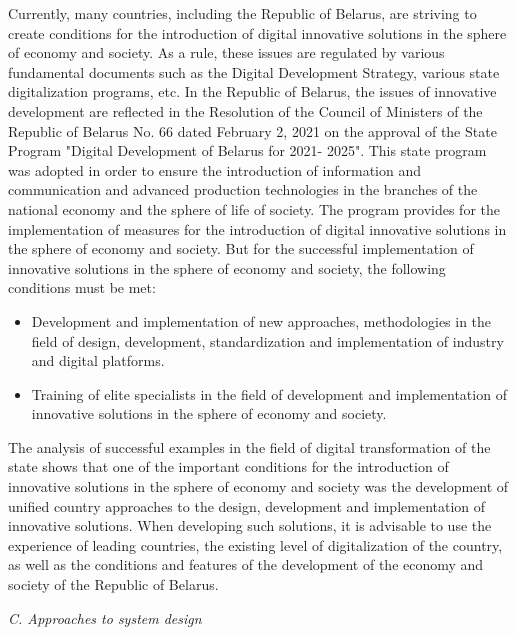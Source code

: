 \documentclass{article}
\begin{document}
\begin{multicols}{2}
Currently, many countries, including the Republic of
Belarus, are striving to create conditions for the introduction of digital innovative solutions in the sphere
of economy and society. As a rule, these issues are
regulated by various fundamental documents such as the
Digital Development Strategy, various state digitalization
programs, etc. In the Republic of Belarus, the issues of
innovative development are reflected in the Resolution
of the Council of Ministers of the Republic of Belarus
No. 66 dated February 2, 2021 on the approval of the
State Program "Digital Development of Belarus for 2021-
2025". This state program was adopted in order to ensure
the introduction of information and communication and
advanced production technologies in the branches of the
national economy and the sphere of life of society. The
program provides for the implementation of measures
for the introduction of digital innovative solutions in the 
sphere of economy and society. But for the successful
implementation of innovative solutions in the sphere of
economy and society, the following conditions must be
met:
\begin{itemize}
\setlength\itemsep{-2pt}
    \item Development and implementation of new approaches, methodologies in the field of design,
development, standardization and implementation of
industry and digital platforms.
\item Training of elite specialists in the field of development and implementation of innovative solutions in
the sphere of economy and society.
\end{itemize}
\vspace{-7pt}
The analysis of successful examples in the field of
digital transformation of the state shows that one of the
important conditions for the introduction of innovative
solutions in the sphere of economy and society was the
development of unified country approaches to the design,
development and implementation of innovative solutions.
When developing such solutions, it is advisable to use
the experience of leading countries, the existing level of
digitalization of the country, as well as the conditions and
features of the development of the economy and society
of the Republic of Belarus.
\vspace{+10pt}
\begin{flushleft}
    \textit{C. Approaches to system design}
\end{flushleft}
\vspace{+10pt}



\end{multicols}
\end{document}

